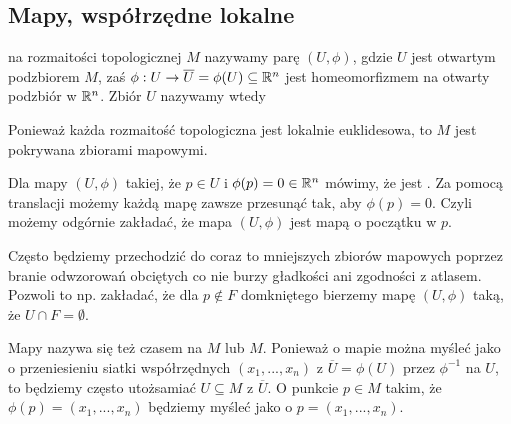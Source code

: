 \subsection{Mapy, współrzędne lokalne}

\begin{definition}[mapa]
   na rozmaitości topologicznej $M$ nazywamy parę $(U, \phi)$, gdzie $U$ jest otwartym podzbiorem $M$, zaś $\phi:U\to\overline{U}=\phi(U)\subseteq\mathbb{R}^n$ jest homeomorfizmem na otwarty podzbiór w $\mathbb{R}^n$. Zbiór $U$ nazywamy wtedy 
\end{definition}

Ponieważ każda rozmaitość topologiczna jest lokalnie euklidesowa, to $M$ jest pokrywana zbiorami mapowymi. 

Dla mapy $(U, \phi)$ takiej, że $p\in U$ i $\phi(p)=0\in\mathbb{R}^n$ mówimy, że jest . Za pomocą translacji możemy każdą mapę zawsze przesunąć tak, aby $\phi(p)=0$. Czyli możemy odgórnie zakładać, że mapa $(U,\phi)$ jest mapą o początku w $p$.

Często będziemy przechodzić do coraz to mniejszych zbiorów mapowych poprzez branie odwzorowań obciętych co nie burzy gładkości ani zgodności z atlasem. Pozwoli to np. zakładać, że dla $p\notin F$ domkniętego bierzemy mapę $(U,\phi)$ taką, że $U\cap F=\emptyset$.

Mapy nazywa się też czasem  na $M$ lub  $M$. Ponieważ o mapie można myśleć jako o przeniesieniu siatki współrzędnych $(x_1,...,x_n)$ z $\overline{U}=\phi(U)$ przez $\phi^{-1}$ na $U$, to będziemy często utożsamiać $U\subseteq M$ z $\overline{U}$. O punkcie $p\in M$ takim, że $\phi(p)=(x_1,...,x_n)$ będziemy myśleć jako o $p=(x_1,...,x_n)$.

\begin{center}
\end{center}
\bigskip

